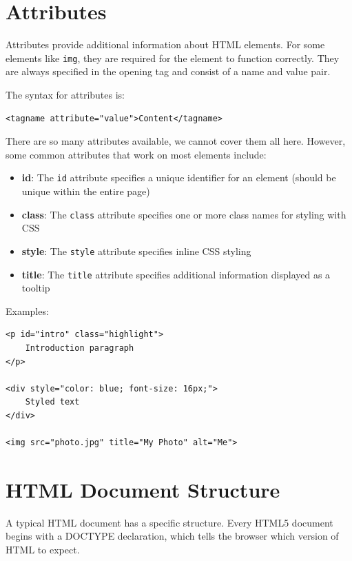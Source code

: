 \section{Attributes}
Attributes provide additional information about HTML elements. For some elements like \verb|img|, they are required for the element to function correctly. 
They are always specified in the opening tag and consist of a name and value pair.

The syntax for attributes is:

\begin{verbatim}
<tagname attribute="value">Content</tagname>
\end{verbatim}

There are so many attributes available, we cannot cover them all here. However, some common attributes that work on most elements include:

\begin{itemize}
    \item \textbf{id}: The \verb|id| attribute specifies a unique identifier for an element (should be unique
      within the entire page)
    \item \textbf{class}: The \verb|class| attribute specifies one or more class names for styling with CSS
    \item \textbf{style}: The \verb|style| attribute specifies inline CSS styling
    \item \textbf{title}: The \verb|title| attribute specifies additional information displayed as a tooltip
\end{itemize}

Examples:

\begin{verbatim}
<p id="intro" class="highlight">
    Introduction paragraph
</p>

<div style="color: blue; font-size: 16px;">
    Styled text
</div>

<img src="photo.jpg" title="My Photo" alt="Me">
\end{verbatim}

\section{HTML Document Structure}
A typical HTML document has a specific structure. Every HTML5 document begins
with a DOCTYPE declaration, which tells the browser which version of HTML to expect.

